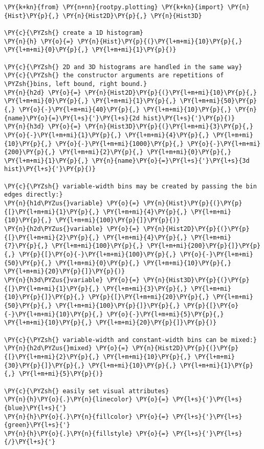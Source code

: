 \begin{Verbatim}[commandchars=\\\{\}]
\PY{k+kn}{from} \PY{n+nn}{rootpy.plotting} \PY{k+kn}{import} \PY{n}{Hist}\PY{p}{,} \PY{n}{Hist2D}\PY{p}{,} \PY{n}{Hist3D}

\PY{c}{\PYZsh{} create a 1D histogram}
\PY{n}{h} \PY{o}{=} \PY{n}{Hist}\PY{p}{(}\PY{l+m+mi}{10}\PY{p}{,} \PY{l+m+mi}{0}\PY{p}{,} \PY{l+m+mi}{1}\PY{p}{)}

\PY{c}{\PYZsh{} 2D and 3D histograms are handled in the same way}
\PY{c}{\PYZsh{} the constructor arguments are repetitions of \PYZsh{}bins, left bound, right bound.}
\PY{n}{h2d} \PY{o}{=} \PY{n}{Hist2D}\PY{p}{(}\PY{l+m+mi}{10}\PY{p}{,} \PY{l+m+mi}{0}\PY{p}{,} \PY{l+m+mi}{1}\PY{p}{,} \PY{l+m+mi}{50}\PY{p}{,} \PY{o}{-}\PY{l+m+mi}{40}\PY{p}{,} \PY{l+m+mi}{10}\PY{p}{,} \PY{n}{name}\PY{o}{=}\PY{l+s}{'}\PY{l+s}{2d hist}\PY{l+s}{'}\PY{p}{)}
\PY{n}{h3d} \PY{o}{=} \PY{n}{Hist3D}\PY{p}{(}\PY{l+m+mi}{3}\PY{p}{,} \PY{o}{-}\PY{l+m+mi}{1}\PY{p}{,} \PY{l+m+mi}{4}\PY{p}{,} \PY{l+m+mi}{10}\PY{p}{,} \PY{o}{-}\PY{l+m+mi}{1000}\PY{p}{,} \PY{o}{-}\PY{l+m+mi}{200}\PY{p}{,} \PY{l+m+mi}{2}\PY{p}{,} \PY{l+m+mi}{0}\PY{p}{,} \PY{l+m+mi}{1}\PY{p}{,} \PY{n}{name}\PY{o}{=}\PY{l+s}{'}\PY{l+s}{3d hist}\PY{l+s}{'}\PY{p}{)}

\PY{c}{\PYZsh{} variable-width bins may be created by passing the bin edges directly:}
\PY{n}{h1d\PYZus{}variable} \PY{o}{=} \PY{n}{Hist}\PY{p}{(}\PY{p}{[}\PY{l+m+mi}{1}\PY{p}{,} \PY{l+m+mi}{4}\PY{p}{,} \PY{l+m+mi}{10}\PY{p}{,} \PY{l+m+mi}{100}\PY{p}{]}\PY{p}{)}
\PY{n}{h2d\PYZus{}variable} \PY{o}{=} \PY{n}{Hist2D}\PY{p}{(}\PY{p}{[}\PY{l+m+mi}{2}\PY{p}{,} \PY{l+m+mi}{4}\PY{p}{,} \PY{l+m+mi}{7}\PY{p}{,} \PY{l+m+mi}{100}\PY{p}{,} \PY{l+m+mi}{200}\PY{p}{]}\PY{p}{,} \PY{p}{[}\PY{o}{-}\PY{l+m+mi}{100}\PY{p}{,} \PY{o}{-}\PY{l+m+mi}{50}\PY{p}{,} \PY{l+m+mi}{0}\PY{p}{,} \PY{l+m+mi}{10}\PY{p}{,} \PY{l+m+mi}{20}\PY{p}{]}\PY{p}{)}
\PY{n}{h3d\PYZus{}variable} \PY{o}{=} \PY{n}{Hist3D}\PY{p}{(}\PY{p}{[}\PY{l+m+mi}{1}\PY{p}{,} \PY{l+m+mi}{3}\PY{p}{,} \PY{l+m+mi}{10}\PY{p}{]}\PY{p}{,} \PY{p}{[}\PY{l+m+mi}{20}\PY{p}{,} \PY{l+m+mi}{50}\PY{p}{,} \PY{l+m+mi}{100}\PY{p}{]}\PY{p}{,} \PY{p}{[}\PY{o}{-}\PY{l+m+mi}{10}\PY{p}{,} \PY{o}{-}\PY{l+m+mi}{5}\PY{p}{,} \PY{l+m+mi}{10}\PY{p}{,} \PY{l+m+mi}{20}\PY{p}{]}\PY{p}{)}

\PY{c}{\PYZsh{} variable-width and constant-width bins can be mixed:}
\PY{n}{h2d\PYZus{}mixed} \PY{o}{=} \PY{n}{Hist2D}\PY{p}{(}\PY{p}{[}\PY{l+m+mi}{2}\PY{p}{,} \PY{l+m+mi}{10}\PY{p}{,} \PY{l+m+mi}{30}\PY{p}{]}\PY{p}{,} \PY{l+m+mi}{10}\PY{p}{,} \PY{l+m+mi}{1}\PY{p}{,} \PY{l+m+mi}{5}\PY{p}{)}

\PY{c}{\PYZsh{} easily set visual attributes}
\PY{n}{h}\PY{o}{.}\PY{n}{linecolor} \PY{o}{=} \PY{l+s}{'}\PY{l+s}{blue}\PY{l+s}{'}
\PY{n}{h}\PY{o}{.}\PY{n}{fillcolor} \PY{o}{=} \PY{l+s}{'}\PY{l+s}{green}\PY{l+s}{'}
\PY{n}{h}\PY{o}{.}\PY{n}{fillstyle} \PY{o}{=} \PY{l+s}{'}\PY{l+s}{/}\PY{l+s}{'}
\end{Verbatim}
